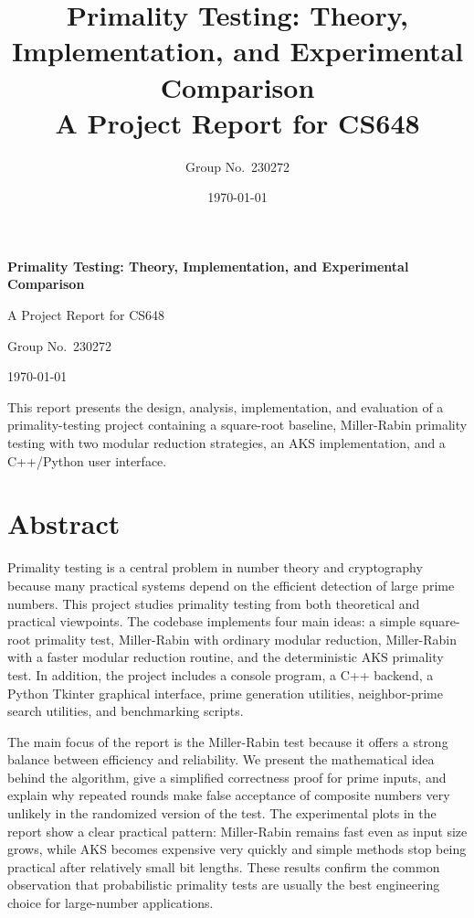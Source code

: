 \documentclass[12pt,a4paper]{report}
\title{
    \vspace{-1.5cm}
    \textbf{Primality Testing: Theory, Implementation, and Experimental Comparison}\\[0.4cm]
    \large A Project Report for CS648
}
\author{
    Group No.\ 230272
}
\date{\today}
\begin{document}
\begin{titlepage}
    \centering
    \vspace*{2.5cm}
    {\Huge \textbf{Primality Testing: Theory, Implementation, and Experimental Comparison}\par}
    \vspace{1cm}
    {\Large A Project Report for CS648\par}
    \vspace{1.5cm}
    {\Large Group No.\ 230272\par}
    \vspace{1cm}
    {\large \today\par}
    \vfill
    {\large This report presents the design, analysis, implementation, and evaluation of a primality-testing project containing a square-root baseline, Miller-Rabin primality testing with two modular reduction strategies, an AKS implementation, and a C++/Python user interface.\par}
    \vfill
\end{titlepage}

\tableofcontents
\clearpage

\chapter*{Abstract}
Primality testing is a central problem in number theory and cryptography because many practical systems depend on the efficient detection of large prime numbers. This project studies primality testing from both theoretical and practical viewpoints. The codebase implements four main ideas: a simple square-root primality test, Miller-Rabin with ordinary modular reduction, Miller-Rabin with a faster modular reduction routine, and the deterministic AKS primality test. In addition, the project includes a console program, a C++ backend, a Python Tkinter graphical interface, prime generation utilities, neighbor-prime search utilities, and benchmarking scripts.

The main focus of the report is the Miller-Rabin test because it offers a strong balance between efficiency and reliability. We present the mathematical idea behind the algorithm, give a simplified correctness proof for prime inputs, and explain why repeated rounds make false acceptance of composite numbers very unlikely in the randomized version of the test. The experimental plots in the report show a clear practical pattern: Miller-Rabin remains fast even as input size grows, while AKS becomes expensive very quickly and simple methods stop being practical after relatively small bit lengths. These results confirm the common observation that probabilistic primality tests are usually the best engineering choice for large-number applications.
\end{document}
